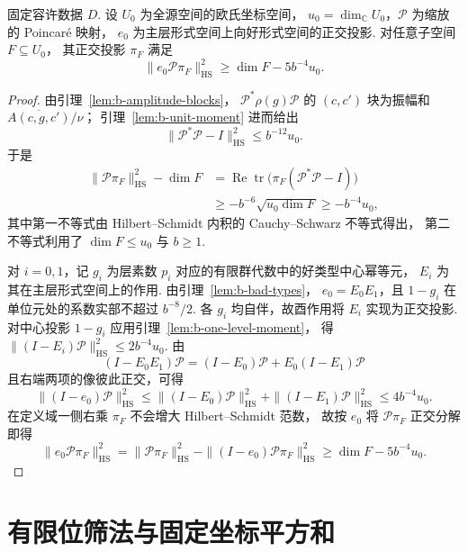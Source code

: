 \begin{lemma}[好形式投影的近等距估计]
\label{lem:b-near-isometry}
\emitthmsource
固定容许数据 $D$. 设 $U_0$ 为全源空间的欧氏坐标空间，
$u_0=\dim_{\mathbb C}U_0$，$\mathcal P$ 为缩放的 Poincaré 映射，
$e_0$ 为主层形式空间上向好形式空间的正交投影. 对任意子空间 $F\subseteq U_0$，
其正交投影 $\pi_F$ 满足
\[
 \|e_0\mathcal P\pi_F\|_{\mathrm{HS}}^2\geq \dim F-5b^{-4}u_0.
\]
\end{lemma}
\begin{proof}
由引理~\ref{lem:b-amplitude-blocks}，
$\mathcal P^*\rho(g)\mathcal P$ 的 $(c,c')$ 块为振幅和 $\overline{A(c,g,c')}/\nu$；
引理~\ref{lem:b-unit-moment} 进而给出
\[
 \|\mathcal P^*\mathcal P-I\|_{\mathrm{HS}}^2\le b^{-12}u_0 .
\]
于是
\begin{align*}
 \|\mathcal P\pi_F\|_{\mathrm{HS}}^2-\dim F
 &=\operatorname{Re}\operatorname{tr}\bigl(\pi_F(\mathcal P^*\mathcal P-I)\bigr)\\
 &\ge -b^{-6}\sqrt{u_0\dim F}\ge -b^{-4}u_0 ,
\end{align*}
其中第一不等式由 Hilbert--Schmidt 内积的 Cauchy--Schwarz 不等式得出，
第二不等式利用了 $\dim F\le u_0$ 与 $b\ge 1$.

对 $i=0,1$，记 $g_i$ 为层素数 $p_i$ 对应的有限群代数中的好类型中心幂等元，
$E_i$ 为其在主层形式空间上的作用.
由引理~\ref{lem:b-bad-types}，
$e_0=E_0E_1$，且 $1-g_i$ 在单位元处的系数实部不超过 $b^{-8}/2$.
各 $g_i$ 均自伴，故酉作用将 $E_i$ 实现为正交投影.
对中心投影 $1-g_i$ 应用引理~\ref{lem:b-one-level-moment}，
得 $\|(I-E_i)\mathcal P\|_{\mathrm{HS}}^2\le 2b^{-4}u_0$.
由
\[
 (I-E_0E_1)\mathcal P=(I-E_0)\mathcal P+E_0(I-E_1)\mathcal P
\]
且右端两项的像彼此正交，可得
\[
 \|(I-e_0)\mathcal P\|_{\mathrm{HS}}^2
 \le \|(I-E_0)\mathcal P\|_{\mathrm{HS}}^2
     +\|(I-E_1)\mathcal P\|_{\mathrm{HS}}^2
 \le 4b^{-4}u_0 .
\]
在定义域一侧右乘 $\pi_F$ 不会增大 Hilbert--Schmidt 范数，
故按 $e_0$ 将 $\mathcal P\pi_F$ 正交分解即得
\[
 \|e_0\mathcal P\pi_F\|_{\mathrm{HS}}^2
 =\|\mathcal P\pi_F\|_{\mathrm{HS}}^2
   -\|(I-e_0)\mathcal P\pi_F\|_{\mathrm{HS}}^2
 \ge \dim F-5b^{-4}u_0 .
\]
\end{proof}

\section{有限位筛法与固定坐标平方和}
\label{sec:b-finite-sieve}

